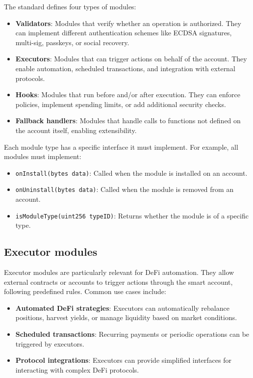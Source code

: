 The standard defines four types of modules:

\begin{itemize}
    \item \textbf{Validators}: Modules that verify whether an operation is authorized. They can implement different authentication schemes like ECDSA signatures, multi-sig, passkeys, or social recovery.
    \item \textbf{Executors}: Modules that can trigger actions on behalf of the account. They enable automation, scheduled transactions, and integration with external protocols.
    \item \textbf{Hooks}: Modules that run before and/or after execution. They can enforce policies, implement spending limits, or add additional security checks.
    \item \textbf{Fallback handlers}: Modules that handle calls to functions not defined on the account itself, enabling extensibility.
\end{itemize}

Each module type has a specific interface it must implement. For example, all modules must implement:

\begin{itemize}
    \item \texttt{onInstall(bytes data)}: Called when the module is installed on an account.
    \item \texttt{onUninstall(bytes data)}: Called when the module is removed from an account.
    \item \texttt{isModuleType(uint256 typeID)}: Returns whether the module is of a specific type.
\end{itemize}

\subsection{Executor modules}

Executor modules are particularly relevant for DeFi automation. They allow external contracts or accounts to trigger actions through the smart account, following predefined rules. Common use cases include:

\begin{itemize}
    \item \textbf{Automated DeFi strategies}: Executors can automatically rebalance positions, harvest yields, or manage liquidity based on market conditions.
    \item \textbf{Scheduled transactions}: Recurring payments or periodic operations can be triggered by executors.
    \item \textbf{Protocol integrations}: Executors can provide simplified interfaces for interacting with complex DeFi protocols.
\end{itemize}

